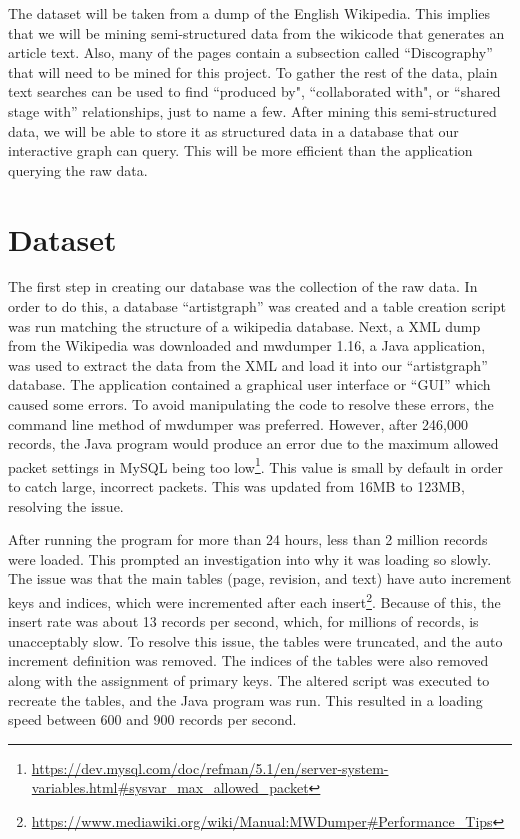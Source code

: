 \documentclass{sig-alternate}
\begin{document}
The dataset will be taken from a dump of the English Wikipedia. This implies 
that we will be mining semi-structured data from the wikicode that generates an 
article text. Also, many of the pages contain a subsection called ``Discography'' 
that will need to be mined for this project. To gather the rest of the data, 
plain text searches can be used to find ``produced by", ``collaborated with", 
or ``shared stage with'' relationships, just to name a few. After mining this 
semi-structured data, we will be able to store it as structured data in a database 
that our interactive graph can query. This will be more efficient than the 
application querying the raw data. 


\section{Dataset}
\label{dataset}

The first step in creating our database was the collection of the raw data.
In order to do this, a database ``artistgraph'' was created and a table creation
script was run matching the structure of a wikipedia database. Next, a XML dump from the Wikipedia was downloaded and
mwdumper 1.16, a Java application, was used to extract the data from the XML and load it
into our ``artistgraph'' database. The application contained a graphical user interface
or ``GUI'' which caused some errors. To avoid manipulating the code to resolve these errors,
the command line method of mwdumper was preferred. However, after 246,000 records, the 
Java program would produce an error due to the maximum allowed packet settings in MySQL
being too low\footnote{\url{https://dev.mysql.com/doc/refman/5.1/en/server-system-variables.html#sysvar_max_allowed_packet}}.
This value is small by default in order to catch large, incorrect packets.
This was updated from 16MB to 123MB, resolving the issue.

After running the program
for more than 24 hours, less than 2 million records were loaded. This prompted an 
investigation into why it was loading so slowly. The issue was that the main tables 
(page, revision, and text) have auto increment keys and indices, which were incremented after each insert\footnote{\url{https://www.mediawiki.org/wiki/Manual:MWDumper#Performance_Tips}}.
Because of this, the insert rate was about 13 records per second, which, for
millions of records, is unacceptably slow. To resolve this issue, the tables
were truncated, and the auto increment definition was removed. The indices
of the tables were also removed along with the assignment of primary keys. The altered
script was executed to recreate the tables, and the Java program was run. This resulted
in a loading speed between 600 and 900 records per second. 
\end{document}
